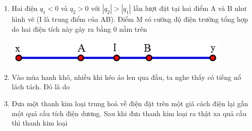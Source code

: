 \begin{enumerate}[label=\bfseries Câu \arabic*:]
	\item Hai điện $q_1<0$ và $q_2>0$ với $\left|q_2\right|>\left|q_1\right|$ lần lượt đặt tại hai điểm A và B như hình vẽ (I là trung điểm của AB). Điểm M có cường độ điện trường tổng hợp do hai điện tích này gây ra bằng 0 nằm trên
	\begin{center}
		\includegraphics[width=0.4\linewidth]{../figs/PH11-MidSem2-02-1}
	\end{center}

\item Vào mùa hanh khô, nhiều khi kéo áo len qua đầu, ta nghe thấy có tiếng nổ lách tách. Đó là do

\item Đưa một thanh kim loại trung hoà về điện đặt trên một giá cách điện lại gần một quả cầu tích điện dương. Sau khi đưa thanh kim loại ra thật xa quả cầu thì thanh kim loại


\end{enumerate}
